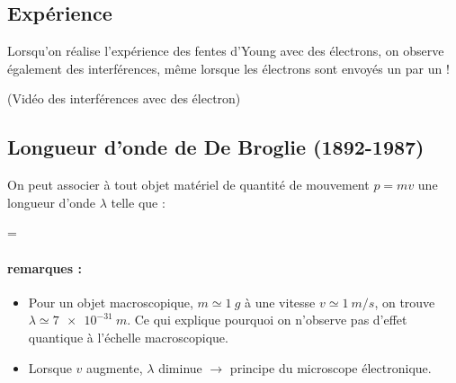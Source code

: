 \documentclass[MPSI]{cours}
\begin{document}
\subsection{Expérience}
\begin{center}
\end{center}
Lorsqu'on réalise l'expérience des fentes d'Young avec des électrons, on observe également des interférences, même lorsque les électrons sont envoyés un par un ! 
\begin{supplement}
(Vidéo des interférences avec des électron)
\end{supplement}
\subsection{Longueur d'onde de De Broglie (1892-1987)}
On peut associer à tout objet matériel de quantité de mouvement $p=mv$ une longueur d'onde $\lambda$ telle que :
\begin{eqencadre}
  \lambda=
\end{eqencadre}

\paragraph{remarques :}
\begin{itemize}
\item Pour un objet macroscopique, $m\simeq\SI{1}{g}$ à une vitesse $v\simeq\SI{1}{m/s}$, on trouve $\lambda\simeq\SI{7e-31}{m}$. Ce qui explique pourquoi on n'observe pas d'effet quantique à l'échelle macroscopique.
\item Lorsque $v$ augmente, $\lambda$ diminue $\rightarrow$ principe du microscope électronique.
\end{itemize}
\end{document}
